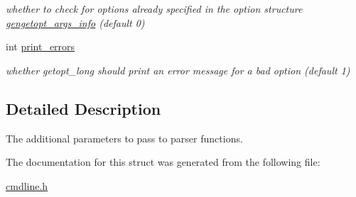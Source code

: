 \begin{DoxyCompactItemize}
\begin{DoxyCompactList}\small\item\em whether to check for options already specified in the option structure \hyperlink{structgengetopt__args__info}{gengetopt\+\_\+args\+\_\+info} (default 0) \end{DoxyCompactList}\item 
\hypertarget{structcmdline__parser__params_a3236f066777488e8502abe05ccd24455}{}int \hyperlink{structcmdline__parser__params_a3236f066777488e8502abe05ccd24455}{print\+\_\+errors}\label{structcmdline__parser__params_a3236f066777488e8502abe05ccd24455}

\begin{DoxyCompactList}\small\item\em whether getopt\+\_\+long should print an error message for a bad option (default 1) \end{DoxyCompactList}\end{DoxyCompactItemize}


\subsection{Detailed Description}
The additional parameters to pass to parser functions. 

The documentation for this struct was generated from the following file\+:\begin{DoxyCompactItemize}
\item 
\hyperlink{cmdline_8h}{cmdline.\+h}\end{DoxyCompactItemize}

